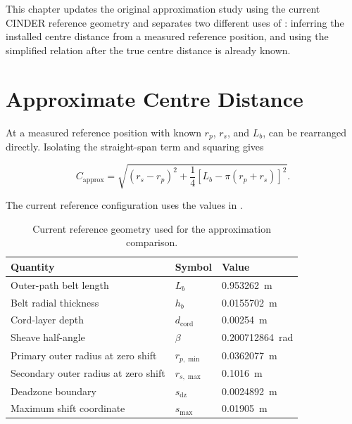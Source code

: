 \documentclass[11pt]{report}
\begin{document}
This chapter updates the original approximation study using the current CINDER
reference geometry and separates two different uses of
: inferring the installed centre distance
from a measured reference position, and using the simplified relation after the
true centre distance is already known.

\section{Approximate Centre Distance}

At a measured reference position with known \(r_p\), \(r_s\), and \(L_b\),
 can be rearranged directly. Isolating the
straight-span term and squaring gives

\begin{equation}
C_{\mathrm{approx}}
=
\sqrt{
(r_s-r_p)^2
+
\frac14
\left[
L_b-\pi(r_p+r_s)
\right]^2
}.
\label{eq:center-distance-small-angle}
\end{equation}

The current reference configuration uses the values in
.

\begin{table}[H]
\centering
\small
\renewcommand{\arraystretch}{1.12}
\begin{tabular}{@{}lll@{}}
\toprule
Quantity & Symbol & Value \\
\midrule
Outer-path belt length & \(L_b\) & \SI{0.953262}{\metre} \\
Belt radial thickness & \(h_b\) & \SI{0.0155702}{\metre} \\
Cord-layer depth & \(d_{\mathrm{cord}}\) & \SI{0.00254}{\metre} \\
Sheave half-angle & \(\beta\) & \SI{0.200712864}{\radian} \\
Primary outer radius at zero shift & \(r_{p,\min}\) & \SI{0.0362077}{\metre} \\
Secondary outer radius at zero shift & \(r_{s,\max}\) & \SI{0.1016}{\metre} \\
Deadzone boundary & \(s_{\mathrm{dz}}\) & \SI{0.0024892}{\metre} \\
Maximum shift coordinate & \(s_{\max}\) & \SI{0.01905}{\metre} \\
\bottomrule
\end{tabular}
\caption{Current reference geometry used for the approximation comparison.}
\label{tab:approximation-reference-geometry}
\end{table}
\end{document}
